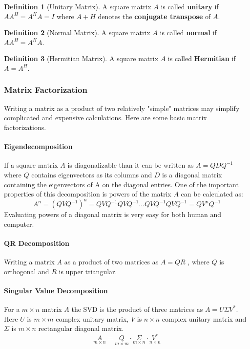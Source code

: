 \documentclass[11pt,a4paper]{article}
\theoremstyle{definition}
\newtheorem{definition}{Definition}[section]
\begin{document}
	\begin{definition}[Unitary Matrix]
		A square matrix $A$ is called \textbf{unitary} if $AA^H = A^HA = I$ where $A+H$ denotes the \textbf{conjugate transpose} of $A$.
	\end{definition}
	\begin{definition}[Normal Matrix]
		A square matrix $A$ is called \textbf{normal} if $AA^H = A^HA$.
	\end{definition}
	\begin{definition}[Hermitian Matrix]
		A square matrix $A$ is called \textbf{Hermitian} if $A = A^H$.
	\end{definition}
	\subsubsection{Matrix Factorization}
	Writing a matrix as a product of two relatively "simple" matrices may simplify complicated and expensive calculations. Here are some basic matrix factorizations. 
	\paragraph{Eigendecomposition}
	If a square matrix $A$ is diagonalizable than it can be written as $A=QDQ^{-1}$ where $Q$ contains eigenvectors as its columns and $D$ is a diagonal matrix containing the eigenvectors of A on the diagonal entries. One of the important properties of this decomposition is powers of the matrix $A$ can be calculated as:
	$$ A^n = (QVQ^{-1})^n = QVQ^{-1}QVQ^{-1} ... QVQ^{-1}QVQ^{-1} = QV^nQ^{-1} $$
	Evaluating powers of a diagonal matrix is very easy for both human and computer.
	\paragraph{QR Decomposition}
	Writing a matrix $A$ as a product of two matrices as $A= QR$ , where $Q$ is orthogonal and $R$ is upper triangular.
	\paragraph{Singular Value Decomposition}
	For a $m\times n$ matrix $A$ the SVD is the product of three matrices as $A = U\Sigma V^* $. Here $U$ is $m \times m$ complex unitary matrix, $V$ is $n \times n$ complex unitary matrix and $\Sigma$ is $m \times n$ rectangular diagonal matrix. 
	$$ \underset{m \times n}{A} = \underset{m \times m}{Q}\cdot \underset{m \times n}{\Sigma}\cdot \underset{n \times n}{V^*}$$
	
\end{document}
